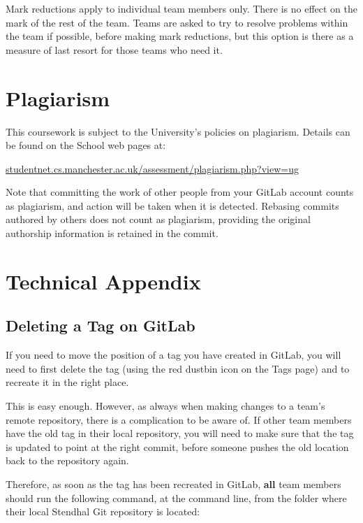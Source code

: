 \documentclass[
]{book}
\begin{document}
Mark reductions apply to individual team members only. There is no effect on the mark of the rest of the team. Teams are asked to try to resolve problems within the team if possible, before making mark reductions, but this option is there as a measure of last resort for those teams who need it.

\hypertarget{plagiarism-1}{%
\section{Plagiarism}\label{plagiarism-1}}

This coursework is subject to the University's policies on plagiarism. Details can be found on the School web pages at:

\href{http://studentnet.cs.manchester.ac.uk/assessment/plagiarism.php?view=ug}{studentnet.cs.manchester.ac.uk/assessment/plagiarism.php?view=ug}

Note that committing the work of other people from your GitLab account counts as plagiarism, and action will be taken when it is detected. Rebasing commits authored by others does not count as plagiarism, providing the original authorship information is retained in the commit.

\hypertarget{technical-appendix}{%
\section{Technical Appendix}\label{technical-appendix}}

\hypertarget{delab}{%
\subsection{Deleting a Tag on GitLab}\label{delab}}

If you need to move the position of a tag you have created in GitLab, you will need to first delete the tag (using the red dustbin icon on the Tags page) and to recreate it in the right place.

This is easy enough. However, as always when making changes to a team's remote repository, there is a complication to be aware of. If other team members have the old tag in their local repository, you will need to make sure that the tag is updated to point at the right commit, before someone pushes the old location back to the repository again.

Therefore, as soon as the tag has been recreated in GitLab, \textbf{all} team members should run the following command, at the command line, from the folder where their local Stendhal Git repository is located:
\end{document}
